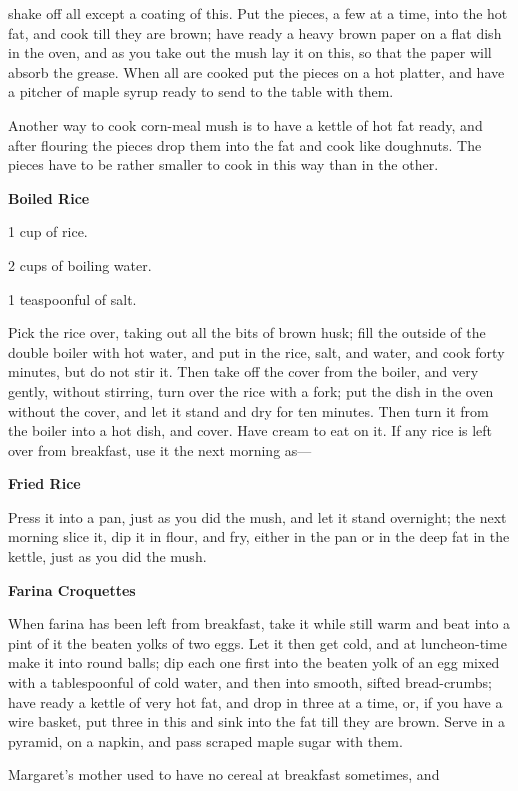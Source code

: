 \documentclass[11pt]{book}
\newcommand{\indpar}{\par\noindent\hspace*{\parindent}}
\newcommand{\ingredient}{\indpar}
\newcommand{\instruction}{\indpar}
\newenvironment{RecipeTitle}{\medskip\begin{center}\large\bf }{\end{center}\smallskip}
\begin{document}
shake off all except a coating of this.  Put the pieces, a few at a time,
into the hot fat, and cook till they are brown; have ready a heavy brown
paper on a flat dish in the oven, and as you take out the mush lay it on
this, so that the paper will absorb the grease.  When all are cooked put
the pieces on a hot platter, and have a pitcher of maple syrup ready to
send to the table with them.
\indpar
  Another way to cook corn-meal mush is to have a kettle of hot fat ready,
and after flouring the pieces drop them into the fat and cook like
doughnuts.  The pieces have to be rather smaller to cook in this way
than in the other.
\begin{RecipeTitle}
Boiled Rice\label{boiled_rice}
\end{RecipeTitle}
\ingredient  1 cup of rice.
\ingredient  2 cups of boiling water.
\ingredient  1 teaspoonful of salt.
\instruction
  Pick the rice over, taking out all the bits of brown husk; fill the
outside of the double boiler with hot water, and put in the rice, salt,
and water, and cook forty minutes, but do not stir it.  Then take off the
cover from the boiler, and very gently, without stirring, turn over the
rice with a fork; put the dish in the oven without the cover, and let it
stand and dry for ten minutes.  Then turn it from the boiler into a hot
dish, and cover.  Have cream to eat on it.  If any rice is left over from
breakfast, use it the next morning as---
\begin{RecipeTitle}
Fried Rice\label{fried_rice} 
\end{RecipeTitle}
\instruction
  Press it into a pan, just as you did the mush, and let it stand
overnight; the next morning slice it, dip it in flour, and fry, either
in the pan or in the deep fat in the kettle, just as you did the mush.
\begin{RecipeTitle}
Farina Croquettes\label{farina_croquettes}
\end{RecipeTitle}
\instruction
  When farina has been left from breakfast, take it while still warm
and beat into a pint of it the beaten yolks of two eggs.  Let it then
get cold, and at luncheon-time make it into round balls; dip each one
first into the beaten yolk of an egg mixed with a tablespoonful of cold
water, and then into smooth, sifted bread-crumbs; have ready a kettle
of very hot fat, and drop in three at a time, or, if you have a wire
basket, put three in this and sink into the fat till they are brown.
Serve in a pyramid, on a napkin, and pass scraped maple sugar with them.
\indpar
  Margaret's mother used to have no cereal at breakfast sometimes, and
\end{document}
